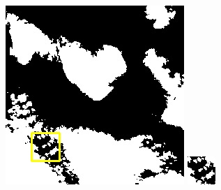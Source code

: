 \documentclass[10pt,UTF8,fntef]{ctexart}
\begin{document}
\begin{figure}[H]
{{\begin{minipage}[b]{0.15\linewidth}
            \includegraphics[width=1\linewidth]{../log/spoon3/cut/LC80290372013257LGN00_17086_mask.jpg}\vspace{4pt}
            \includegraphics[width=1\linewidth]{../log/spoon3/cut/tmp_cut_LC80290372013257LGN00_17086_mask.jpg}\vspace{4pt}

\end{minipage}}}
\end{figure}
\end{document}
